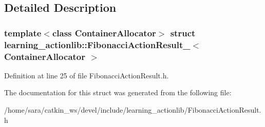 \subsection{Detailed Description}
\subsubsection*{template$<$class Container\+Allocator$>$\newline
struct learning\+\_\+actionlib\+::\+Fibonacci\+Action\+Result\+\_\+$<$ Container\+Allocator $>$}



Definition at line 25 of file Fibonacci\+Action\+Result.\+h.



The documentation for this struct was generated from the following file\+:\begin{DoxyCompactItemize}
\item 
/home/sara/catkin\+\_\+ws/devel/include/learning\+\_\+actionlib/Fibonacci\+Action\+Result.\+h\end{DoxyCompactItemize}
